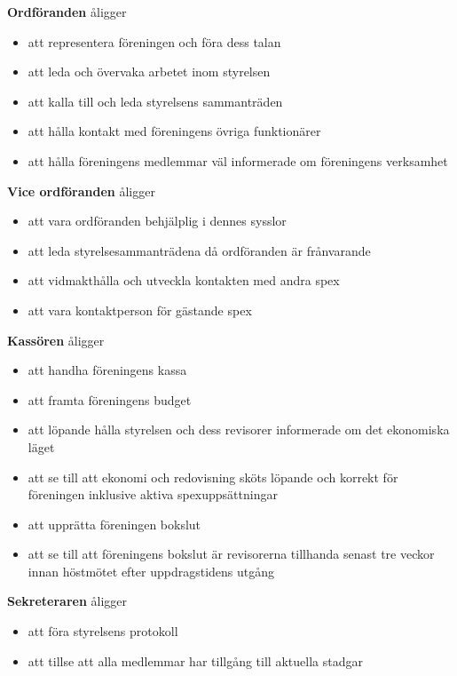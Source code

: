 \documentclass[a4paper]{article}
\begin{document}
\noindent
\textbf{Ordföranden} åligger

\begin{itemize}
  \item att representera föreningen och föra dess talan
  \item att leda och övervaka arbetet inom styrelsen
  \item att kalla till och leda styrelsens sammanträden
  \item att hålla kontakt med föreningens övriga funktionärer
  \item att hålla föreningens medlemmar väl informerade om föreningens verksamhet
\end{itemize}

\noindent
\textbf{Vice ordföranden} åligger

\begin{itemize}
  \item att vara ordföranden behjälplig i dennes sysslor
  \item att leda styrelsesammanträdena då ordföranden är frånvarande
  \item att vidmakthålla och utveckla kontakten med andra spex
  \item att vara kontaktperson för gästande spex
\end{itemize}

\noindent
\textbf{Kassören} åligger

\begin{itemize}
  \item att handha föreningens kassa
  \item att framta föreningens budget
  \item att löpande hålla styrelsen och dess revisorer informerade om det ekonomiska läget
  \item att se till att ekonomi och redovisning sköts löpande och korrekt för föreningen inklusive aktiva spexuppsättningar
  \item att upprätta föreningen bokslut
  \item att se till att föreningens bokslut är revisorerna tillhanda senast tre veckor innan höstmötet efter uppdragstidens utgång
\end{itemize}

\noindent
\textbf{Sekreteraren} åligger

\begin{itemize}
  \item att föra styrelsens protokoll
  \item att tillse att alla medlemmar har tillgång till aktuella stadgar
\end{itemize}
\end{document}
